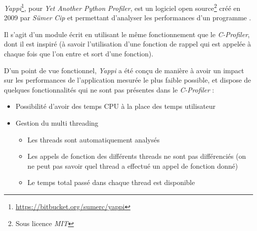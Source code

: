 \emph{Yappi}\footnote{\url{https://bitbucket.org/sumerc/yappi}}, pour \emph{Yet Another Python Profiler}, est un logiciel open source\footnote{Sous licence \emph{MIT}} créé en 2009 par \emph{Sümer Cip} et permettant d'analyser les performances d'un programme \Python.

Il s'agit d'un module écrit en \C utilisant le même fonctionnement que le \emph{C-Profiler}, dont il est inspiré (à savoir l'utilisation d'une fonction de rappel qui est appelée à chaque fois que l'on entre et sort d'une fonction).

D'un point de vue fonctionnel, \emph{Yappi} a été conçu de manière à avoir un impact sur les performances de l'application mesurée le plus faible possible, et dispose de quelques fonctionnalités qui ne sont pas présentes dans le \emph{C-Profiler} :
\begin{itemize}
\item Possibilité d'avoir des temps CPU à la place des temps utilisateur
\item Gestion du multi threading
\begin{itemize}
\item Les threads sont automatiquement analysés
\item Les appels de fonction des différents threads ne sont pas différenciés (on ne peut pas savoir quel thread a effectué un appel de fonction donné) 
\item Le temps total passé dans chaque thread est disponible
\end{itemize}
\end{itemize}